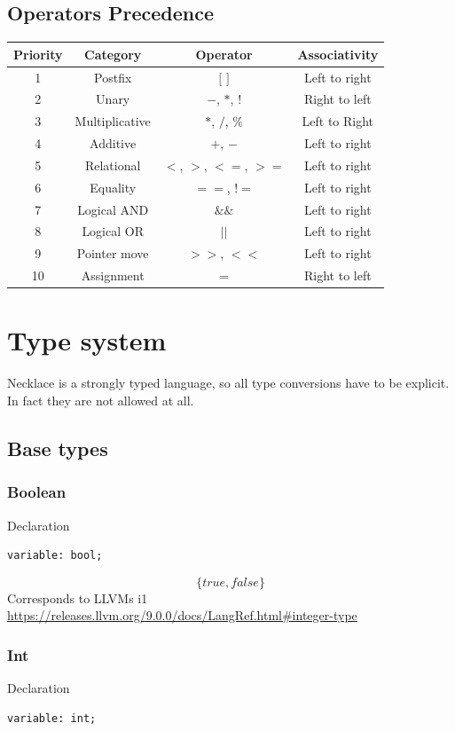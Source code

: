 \documentclass{article}
\begin{document}
\subsection{Operators Precedence}
\begin{center}
\begin{tabular}{||c | c | c |  c|}
 \hline
 Priority & Category & Operator & Associativity\\
 \hline
 1 & Postfix  & $[$ $]$ & Left to right \\  
 \hline
 2 & Unary & $-$, $*$, $!$ & Right to left    \\
  \hline
 3 & Multiplicative & $*$, $/$, $\%$ & Left to Right    \\
 \hline
 4 & Additive & $+$, $-$ & Left to right \\ 
 \hline
 5 & Relational	& $<$, $>$, $<=$, $>=$ & Left to right\\
 \hline
 6 & Equality & $==$, $!=$ & Left to right \\
 \hline
 7 & Logical AND & $\&\&$ & Left to right \\
 \hline
 8 & Logical OR & $||$ & Left to right \\
 \hline
 9 & Pointer move & $>>$, $<<$ & Left to right \\
 \hline
 10 & Assignment & $=$ & Right to left \\
 \hline
\end{tabular}
\end{center}
\section{Type system}
Necklace is a strongly typed language, so all type conversions have to be explicit. In fact they are not allowed at all.
\subsection{Base types}
\subsubsection{Boolean}
Declaration 
\begin{verbatim}
variable: bool;
\end{verbatim}
$$
\{true, false\}
$$
Corresponds to LLVMs i1 \url{https://releases.llvm.org/9.0.0/docs/LangRef.html#integer-type}
\subsubsection{Int}
Declaration 
\begin{verbatim}
variable: int;
\end{verbatim}
\end{document}
